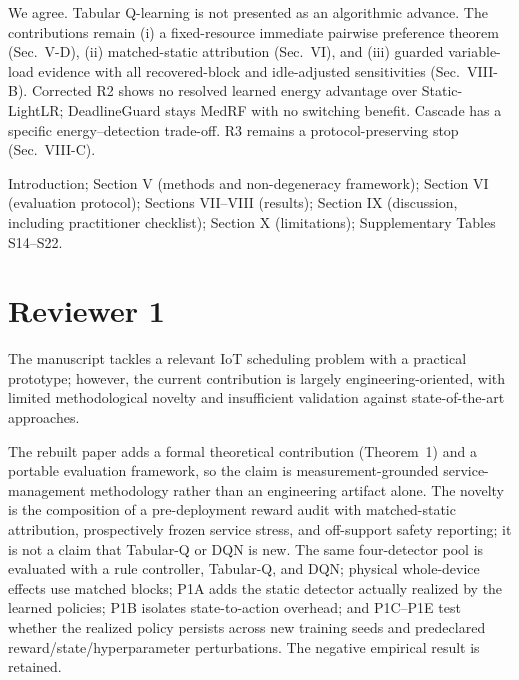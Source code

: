 \documentclass[10pt,a4paper]{article}
\begin{document}
\begin{authorresponsebox}
We agree. Tabular Q-learning is not presented as an algorithmic advance. The contributions remain (i) a fixed-resource immediate pairwise preference theorem (Sec.~V-D), (ii) matched-static attribution (Sec.~VI), and (iii) guarded variable-load evidence with all recovered-block and idle-adjusted sensitivities (Sec.~VIII-B). Corrected R2 shows no resolved learned energy advantage over Static-LightLR; DeadlineGuard stays MedRF with no switching benefit. Cascade has a specific energy--detection trade-off. R3 remains a protocol-preserving stop (Sec.~VIII-C).
\end{authorresponsebox}

\begin{wherebox}
Introduction; Section V (methods and non-degeneracy framework); Section VI (evaluation protocol); Sections VII--VIII (results); Section IX (discussion, including practitioner checklist); Section X (limitations); Supplementary Tables S14--S22.
\end{wherebox}

\section*{Reviewer 1}

\begin{rcommentbox}
The manuscript tackles a relevant IoT scheduling problem with a practical prototype; however, the current contribution is largely engineering-oriented, with limited methodological novelty and insufficient validation against state-of-the-art approaches.
\end{rcommentbox}

\begin{authorresponsebox}
The rebuilt paper adds a formal theoretical contribution (Theorem~1) and a portable evaluation framework, so the claim is measurement-grounded service-management methodology rather than an engineering artifact alone. The novelty is the composition of a pre-deployment reward audit with matched-static attribution, prospectively frozen service stress, and off-support safety reporting; it is not a claim that Tabular-Q or DQN is new. The same four-detector pool is evaluated with a rule controller, Tabular-Q, and DQN; physical whole-device effects use matched blocks; P1A adds the static detector actually realized by the learned policies; P1B isolates state-to-action overhead; and P1C--P1E test whether the realized policy persists across new training seeds and predeclared reward/state/hyperparameter perturbations. The negative empirical result is retained.
\end{authorresponsebox}
\end{document}
